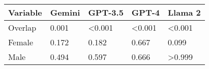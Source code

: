 
\begin{tabular}{lllll}
\toprule
Variable & Gemini & GPT-3.5 & GPT-4 & Llama 2\\
\midrule
Overlap & 0.001 & <0.001 & <0.001 & <0.001\\
Female & 0.172 & 0.182 & 0.667 & 0.099\\
Male & 0.494 & 0.597 & 0.666 & >0.999\\
\bottomrule
\end{tabular}
